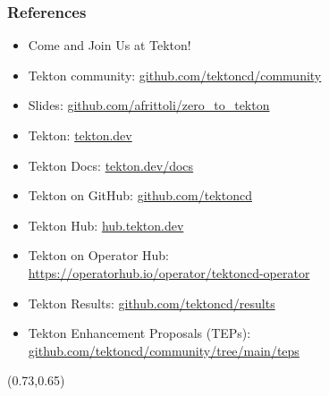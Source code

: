 \documentclass[aspectratio=169,11pt,hyperref={colorlinks=true}]{beamer}
\begin{document}
\begin{blackframe}
  \frametitle{References}
  \begin{itemize}
    \item \large Come and Join Us at Tekton!
    \item \normalsize Tekton community: \href{https://github.com/tektoncd/community}{github.com/tektoncd/community} \\
  \end{itemize}
  \begin{itemize}
    \item Slides: \href{https://github.com/afrittoli/zero_to_tekton/blob/cnd2021/zero_to_tekton.pdf}{github.com/afrittoli/zero\_to\_tekton}
    \item Tekton: \href{https://tekton.dev}{tekton.dev}
    \item Tekton Docs: \href{https://tekton.dev/docs}{tekton.dev/docs}
    \item Tekton on GitHub: \href{https://github.com/tektoncd}{github.com/tektoncd}
    \item Tekton Hub: \href{https://hub.tekton.dev}{hub.tekton.dev}
    \item Tekton on Operator Hub:\\\href{https://https://operatorhub.io/operator/tektoncd-operator}{https://operatorhub.io/operator/tektoncd-operator}
    \item Tekton Results: \href{https://github.com/tektoncd/results}{github.com/tektoncd/results}
    \item Tekton Enhancement Proposals (TEPs): \href{https://github.com/tektoncd/community/tree/main/teps\#tekton-enhancement-proposals-teps}{github.com/tektoncd/community/tree/main/teps}
  \end{itemize}
  \begin{textblock*}{0.13\paperwidth}(0.73\paperwidth,0.65\paperheight)
    
  \end{textblock*}
\end{blackframe}
\end{document}

